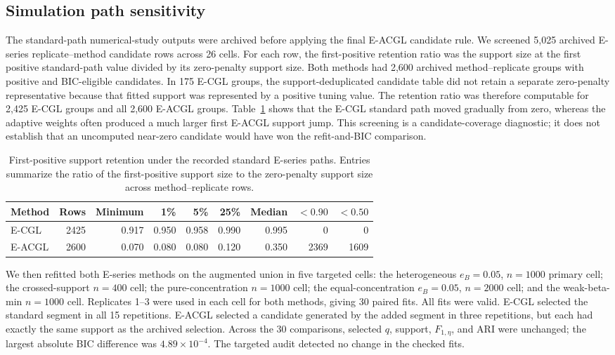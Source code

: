 \documentclass[preprint,12pt,authoryear]{elsarticle}
\begin{document}
\subsection{Simulation path sensitivity}

The standard-path numerical-study outputs were archived before applying the
final E-ACGL candidate rule. We screened 5,025
archived E-series replicate--method candidate rows across 26 cells. For each
row, the first-positive retention ratio was the support size at the first
positive standard-path value divided by its zero-penalty support size.
Both methods had 2,600 archived method--replicate groups with positive and
BIC-eligible candidates. In 175 E-CGL groups, the support-deduplicated
candidate table did not retain a separate zero-penalty representative because
that fitted support was represented by a positive tuning value. The retention
ratio was therefore computable for 2,425 E-CGL groups and all 2,600 E-ACGL
groups.
Table~\ref{tab:s-support-retention} shows that the E-CGL standard path moved
gradually from zero, whereas the adaptive weights often produced a much larger
first E-ACGL support jump. This screening is a candidate-coverage diagnostic;
it does not establish that an uncomputed near-zero candidate would have won
the refit-and-BIC comparison.

\begin{table}[H]
\centering
\small
\setlength{\tabcolsep}{4pt}
\caption{First-positive support retention under the recorded standard
E-series paths. Entries summarize the ratio of the first-positive support size
to the zero-penalty support size across method--replicate rows.}
\label{tab:s-support-retention}
\begin{tabular}{lrrrrrrrr}
\toprule
Method & Rows & Minimum & 1\% & 5\% & 25\% & Median & $<0.90$ & $<0.50$ \\
\midrule
E-CGL  & 2425 & 0.917 & 0.950 & 0.958 & 0.990 & 0.995 & 0 & 0 \\
E-ACGL & 2600 & 0.070 & 0.080 & 0.080 & 0.120 & 0.350 & 2369 & 1609 \\
\bottomrule
\end{tabular}
\end{table}

We then refitted both E-series methods on the augmented union in five targeted
cells: the heterogeneous $e_B=0.05$, $n=1000$ primary cell; the crossed-support
$n=400$ cell; the pure-concentration $n=1000$ cell; the equal-concentration
$e_B=0.05$, $n=2000$ cell; and the weak-beta-min $n=1000$ cell. Replicates
1--3 were used in each cell for both methods, giving 30 paired fits. All fits
were valid. E-CGL selected the standard segment in all 15 repetitions. E-ACGL
selected a candidate generated by the added segment in three repetitions, but
each had exactly the same support as the archived selection. Across the 30
comparisons, selected $q$, support, $F_{1,\eta}$, and ARI were unchanged; the
largest absolute BIC difference was $4.89\times10^{-4}$. The targeted audit
detected no change in the checked fits.
\end{document}
